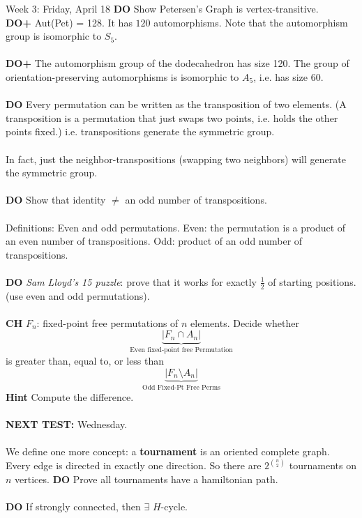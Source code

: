 \documentclass[12pt]{article}
\theoremstyle{remark}
\newcommand*\tund[2]{\underbrace{#1}_\text{#2}}
\begin{document}
\begin{section}{Week 3: Friday, April 18}
\textbf{DO} Show Petersen's Graph is vertex-transitive.
\\\textbf{DO+} Aut(Pet) = 128. It has $120$ automorphisms. Note that the automorphism group is isomorphic to $S_5$.
\\\\
\textbf{DO+}
The automorphism group of the dodecahedron has size 120.
The group of orientation-preserving automorphisms is isomorphic to $A_5$, i.e. has size 60.
\\\\
\textbf{DO} Every permutation can be written as the transposition of two elements. (A transposition is a permutation that just swaps two points, i.e. holds the other points fixed.) i.e. transpositions generate the symmetric group.
\\\\
In fact, just the neighbor-transpositions (swapping two neighbors) will generate the symmetric group.
\\\\
\textbf{DO} Show that identity $\neq$ an odd number of transpositions.
\\\\
Definitions: Even and odd permutations. Even: the permutation is a product of an even number of transpositions. Odd: product of an odd number of transpositions.
\\\\
\textbf{DO} \textit{Sam Lloyd's 15 puzzle}: prove that it works for exactly $\frac 12$ of starting positions. (use even and odd permutations).
\\\\
\textbf{CH} $F_n$: fixed-point free permutations of $n$ elements. Decide whether $$\tund{|F_n \cap A_n|}{Even fixed-point free Permutation}$$ is greater than, equal to, or less than $$\tund{|F_n \setminus A_n|}{Odd Fixed-Pt Free Perms}$$ \textbf{Hint} Compute the difference.
\\\\
\textbf{NEXT TEST:} Wednesday. 
\\\\
We define one more concept: a \textbf{tournament} is an oriented complete graph. Every edge is directed in exactly one direction. So there are $2^{n \choose 2}$ tournaments on $n$ vertices. \textbf{DO} Prove all tournaments have a hamiltonian path.
\\\\
\textbf{DO} If strongly connected, then $\exists$ $H$-cycle.
\end{section}
\end{document}
